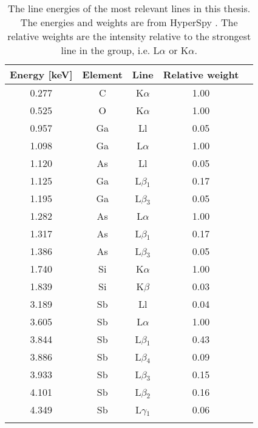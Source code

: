\begin{table}[p]
    \centering
    \caption{
        The line energies of the most relevant lines in this thesis.
        The energies and weights are from HyperSpy \cite{hyperspy_1.7.1}.
        The relative weights are the intensity relative to the strongest line in the group, i.e. L$\alpha$ or K$\alpha$.
    }
    \label{tab:theory:lineEnergies}
    \begin{tabular}{ccccc}
        Energy [keV] & Element & Line          & Relative weight \\
        \hline
        0.277        & C       & K$\alpha$     & 1.00            \\
        0.525        & O       & K$\alpha$     & 1.00            \\
        0.957        & Ga      & Ll            & 0.05            \\
        1.098        & Ga      & L$\alpha$     & 1.00            \\
        1.120        & As      & Ll            & 0.05            \\
        1.125        & Ga      & L$\beta$$_1$  & 0.17            \\
        1.195        & Ga      & L$\beta$$_3$  & 0.05            \\
        1.282        & As      & L$\alpha$     & 1.00            \\
        1.317        & As      & L$\beta$$_1$  & 0.17            \\
        1.386        & As      & L$\beta$$_3$  & 0.05            \\
        1.740        & Si      & K$\alpha$     & 1.00            \\
        1.839        & Si      & K$\beta$      & 0.03            \\
        3.189        & Sb      & Ll            & 0.04            \\
        3.605        & Sb      & L$\alpha$     & 1.00            \\
        3.844        & Sb      & L$\beta$$_1$  & 0.43            \\
        3.886        & Sb      & L$\beta$$_4$  & 0.09            \\
        3.933        & Sb      & L$\beta$$_3$  & 0.15            \\
        4.101        & Sb      & L$\beta$$_2$  & 0.16            \\
        4.349        & Sb      & L$\gamma$$_1$ & 0.06            \\
$$
\end{tabular}
\end{table}
